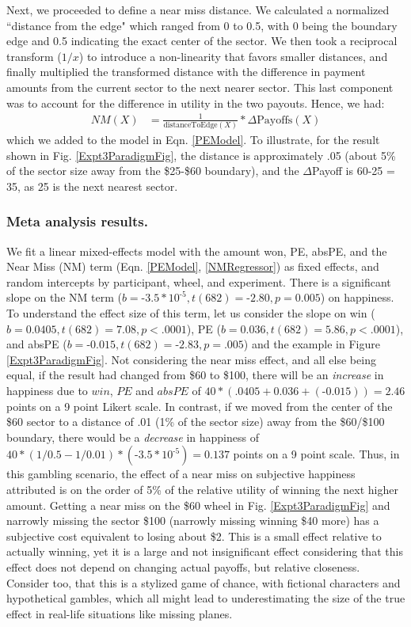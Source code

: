 \documentclass[10pt,letterpaper]{article}
\begin{document}
Next, we proceeded to define a near miss distance. We calculated a normalized ``distance from the edge" which ranged from 0 to 0.5, with 0 being the boundary edge and 0.5 indicating the exact center of the sector. We then took a reciprocal transform ($1/x$) to introduce a non-linearity that favors smaller distances, and finally multiplied the transformed distance with the difference in payment amounts from the current sector to the next nearer sector. This last component was to account for the difference in utility in the two payouts. Hence, we had:
\begin{align}
NM(X) &= \frac{1}{\text{distanceToEdge}(X)} * \Delta\text{Payoffs}(X) \label{NMRegressor}
\end{align}
which we added to the model in Eqn. \ref{PEModel}. To illustrate, for the result shown in Fig. \ref{Expt3ParadigmFig}, the distance is approximately .05 (about 5\% of the sector size away from the \$25-\$60 boundary), and the $\Delta$Payoff is 60-25 = 35, as 25 is the next nearest sector.

\subsubsection{Meta analysis results.}

We fit a linear mixed-effects model with the amount won, PE, absPE, and the Near Miss (NM) term (Eqn. \ref{PEModel}, \ref{NMRegressor}) as fixed effects, and random intercepts by participant, wheel, and experiment. There is a significant slope on the NM term ($b = \text{-}3.5 * 10^{\text{-}5}, t(682)=\text{-}2.80, p=0.005$) on happiness. To understand the effect size of this term, let us consider the slope on win ($b = 0.0405, t(682) = 7.08, p<.0001$), PE ($b=0.036, t(682)=5.86, p<.0001$), and absPE ($b=\text{-}0.015, t(682) = \text{-}2.83, p=.005$) and the example in Figure \ref{Expt3ParadigmFig}. Not considering the near miss effect, and all else being equal, if the result had changed from \$60 to \$100, there will be an \textit{increase} in happiness due to $win$, $PE$ and $absPE$ of $40*(.0405+0.036+(\text{-}0.015)) = 2.46$ points on a 9 point Likert scale. In contrast, if we moved from the center of the \$60 sector to a distance of .01 (1\% of the sector size) away from the \$60/\$100 boundary, there would be a \textit{decrease} in happiness of $40*(1/0.5 - 1/0.01)*(\text{-}3.5 * 10^{\text{-}5}) = 0.137$ points on a 9 point scale. Thus, in this gambling scenario, the effect of a near miss on subjective happiness attributed is on the order of 5\% of the relative utility of winning the next higher amount. Getting a near miss on the \$60 wheel in Fig. \ref{Expt3ParadigmFig} and narrowly missing the sector \$100 (narrowly missing winning \$40 more) has a subjective cost equivalent to losing about \$2. This is a small effect relative to actually winning, yet it is  a large and not insignificant effect considering that this effect does not depend on changing actual payoffs, but relative closeness. Consider too, that this is a stylized game of chance, with fictional characters and hypothetical gambles, which all might lead to underestimating the size of the true effect in real-life situations like missing planes.
\end{document}
